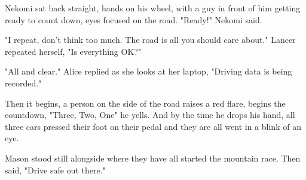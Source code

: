 Nekomi sat back straight, hands on his wheel, with a guy in front of him getting ready to count down, eyes focused on the road. "Ready!" Nekomi said.

"I repeat, don't think too much. The road is all you should care about." Lancer repeated herself, "Is everything OK?"

"All and clear." Alice replied as she looks at her laptop, "Driving data is being recorded."

Then it begins, a person on the side of the road raises a red flare, begins the countdown, "Three, Two, One" he yells. And by the time he drops his hand, all three cars pressed their foot on their pedal and they are all went in a blink of an eye.

Mason stood still alongside where they have all started the mountain race. Then said, "Drive safe out there."
